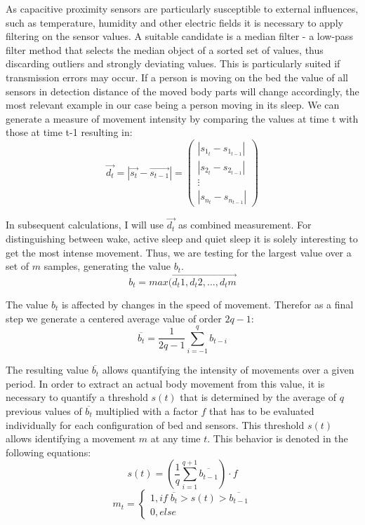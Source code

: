 As capacitive proximity sensors are particularly susceptible to external influences, such as temperature, humidity and other electric fields it is necessary to apply filtering on the sensor values. A suitable candidate is a median filter - a low-pass filter method that selects the median object of a sorted set of values, thus discarding outliers and strongly deviating values. This is particularly suited if transmission errors may occur.
If a person is moving on the bed the value of all sensors in detection distance of the moved body parts will change accordingly, the most relevant example in our case being a person moving in its sleep. We can generate a measure of movement intensity by comparing the values at time t with those at time t-1 resulting in:
\begin{equation}
\overrightarrow{d_t}=\left | \overrightarrow{s_t}-\overrightarrow{s_{t-1}} \right | = \begin{pmatrix}
\left | s_{1_t}-s_{1_{t-1}} \right |\\ 
\left | s_{2_t}-s_{2_{t-1}} \right |\\ 
\vdots \\ 
\left | s_{n_t}-s_{n_{t-1}} \right |
\end{pmatrix}
\end{equation}

In subsequent calculations, I will use $\overrightarrow{d_t}$ as combined measurement. For distinguishing between wake, active sleep and quiet sleep it is solely interesting to get the most intense movement. Thus, we are testing for the largest value over a set of $m$ samples, generating the value $b_t$.
\begin{equation}
b_t=max(\overrightarrow{d_t1, d_t2, \hdots, d_tm}
\end{equation}

The value $b_t$ is affected by changes in the speed of movement. Therefor as a final step we generate a centered average value of order $2q-1$:
\begin{equation}
\overline{b_t}=\frac{1}{2q-1}\sum_{i=-1}^q{b_{t-i}}
\end{equation}

The resulting value $\overline{b_t}$ allows quantifying the intensity of movements over a given period. In order to extract an actual body movement from this value, it is necessary to quantify a threshold $s(t)$ that is determined by the average of $q$ previous values of $\overline{b_t}$ multiplied with a factor $f$ that has to be evaluated individually for each configuration of bed and sensors. This threshold $s(t)$ allows identifying a movement $m$ at any time $t$. This behavior is denoted in the following equations:
\begin{equation}
s(t)=\left ( \frac{1}{q}\sum_{i=1}^{q+1}{\overline{b_{t-1}}} \right )\cdot f
\end{equation}
\begin{equation}
m_t=\left\{\begin{matrix}
1,if \; \overline{b_t}> s(t)>\overline{b_{{t-1}}}\\ 
0,else
\end{matrix}\right.
\end{equation}

